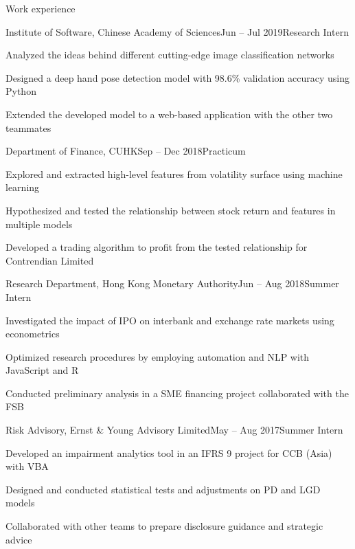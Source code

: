 \documentclass[10pt]{resume} %
\begin{document}
\begin{rSection}{Work experience}

\begin{rSubsection}{Institute of Software, Chinese Academy of Sciences}{Jun -- Jul 2019}{Research Intern}{}
\item Analyzed the ideas behind different cutting-edge image classification networks
\item Designed a deep hand pose detection model with 98.6\% validation accuracy using Python
\item Extended the developed model to a web-based application with the other two teammates
\end{rSubsection}


\begin{rSubsection}{Department of Finance, CUHK}{Sep -- Dec 2018}{Practicum}{}
\item Explored and extracted high-level features from volatility surface using machine learning
\item Hypothesized and tested the relationship between stock return and features in multiple models
\item Developed a trading algorithm to profit from the tested relationship for Contrendian Limited
\end{rSubsection}


\begin{rSubsection}{Research Department, Hong Kong Monetary Authority}{Jun -- Aug 2018}{Summer Intern}{}
\item Investigated the impact of IPO on interbank and exchange rate markets using econometrics
\item Optimized research procedures by employing automation and NLP with JavaScript and R
\item Conducted preliminary analysis in a SME financing project collaborated with the FSB
\end{rSubsection}


\begin{rSubsection}{Risk Advisory, Ernst \& Young Advisory Limited}{May -- Aug 2017}{Summer Intern}{}
\item Developed an impairment analytics tool in an IFRS 9 project for CCB (Asia) with VBA
\item Designed and conducted statistical tests and adjustments on PD and LGD models
\item Collaborated with other teams to prepare disclosure guidance and strategic advice
\end{rSubsection}

\end{rSection}
\end{document}

